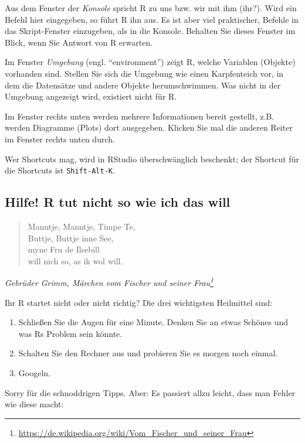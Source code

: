 \documentclass[12pt,ngerman,]{book}
\providecommand{\tightlist}{%
  \setlength{\itemsep}{0pt}\setlength{\parskip}{0pt}}
\let\rmarkdownfootnote\footnote%
\def\footnote{\protect\rmarkdownfootnote}
\begin{document}
Aus dem Fenster der \emph{Konsole} spricht R zu uns bzw.
wir mit ihm (ihr?). Wird ein Befehl hier eingegeben, so führt R ihn aus.
Es ist aber viel praktischer, Befehle in das Skript-Fenster einzugeben,
als in die Konsole. Behalten Sie dieses Fenster im Blick, wenn Sie
Antwort von R erwarten.

Im Fenster \emph{Umgebung} (engl. ``environment'') zeigt
R, welche Variablen (Objekte) vorhanden sind. Stellen Sie sich die
Umgebung wie einen Karpfenteich vor, in dem die Datensätze und andere
Objekte herumschwimmen. Was nicht in der Umgebung angezeigt wird,
existiert nicht für R.

Im Fenster rechts unten werden mehrere Informationen bereit gestellt,
z.B. werden Diagramme (Plots) dort ausgegeben. Klicken Sie mal die
anderen Reiter im Fenster rechts unten durch.

Wer Shortcuts mag, wird in RStudio überschwänglich beschenkt; der
Shortcut für die Shortcuts ist \texttt{Shift-Alt-K}.

\subsection{Hilfe! R tut nicht so wie ich das
will}\label{hilfe-r-tut-nicht-so-wie-ich-das-will}

\begin{quote}
Manntje, Manntje, Timpe Te,\\
Buttje, Buttje inne See,\\
myne Fru de Ilsebill\\
will nich so, as ik wol will.
\end{quote}

\emph{Gebrüder Grimm, Märchen vom Fischer und seiner Frau\footnote{\url{https://de.wikipedia.org/wiki/Vom_Fischer_und_seiner_Frau}}}

Ihr R startet nicht oder nicht richtig? Die drei wichtigsten Heilmittel
sind:

\begin{enumerate}
\def\labelenumi{\arabic{enumi}.}
\tightlist
\item
  Schließen Sie die Augen für eine Minute. Denken Sie an etwas Schönes
  und was Rs Problem sein könnte.
\item
  Schalten Sie den Rechner aus und probieren Sie es morgen noch einmal.
\item
  Googeln.
\end{enumerate}

Sorry für die schnoddrigen Tipps. Aber: Es passiert allzu leicht, dass
man Fehler wie diese macht:
\end{document}
